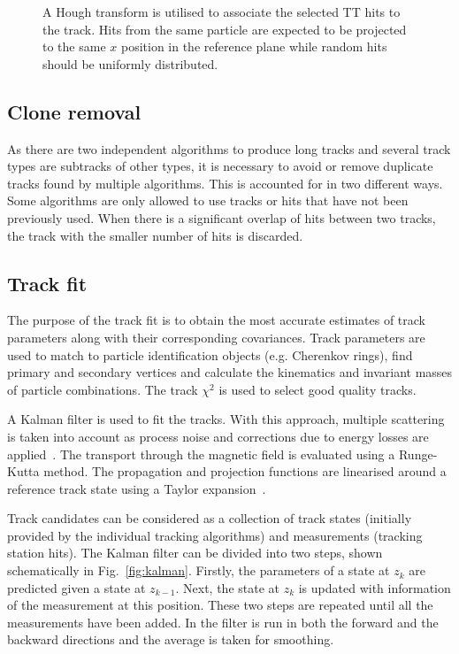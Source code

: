 \begin{figure}[!tb]
  \centering
  
  \caption{A Hough transform is utilised to associate the selected TT hits to the \velo track. Hits from the same particle are expected to be projected to the same $x$ position in the reference plane while random hits should be uniformly distributed.}
  \label{fig:velott-tracking}
\end{figure}

\subsection{Clone removal}
\label{sec:track:clone}

As there are two independent algorithms to produce long tracks and several track types are subtracks of other types, it is necessary to avoid or remove duplicate tracks found by multiple algorithms. This is accounted for in two different ways. Some algorithms are only allowed to use tracks or hits that have not been previously used. When there is a significant overlap of hits between two tracks, the track with the smaller number of hits is discarded. 

\subsection{Track fit}
\label{sec:track:fit}

The purpose of the track fit  is to obtain the most accurate estimates of track parameters along with their corresponding covariances. Track parameters are used to match to particle identification objects (e.g. Cherenkov rings), find primary and secondary vertices and calculate the kinematics and invariant masses of particle combinations. The track $\chi^{2}$ is used to select good quality tracks. 

A Kalman filter is used to fit the tracks. With this approach, multiple scattering is taken into account as process noise and corrections due to energy losses are applied~\cite{kalman}. The transport through the magnetic field is evaluated using a Runge-Kutta method. The propagation and projection functions are linearised around a reference track state using a Taylor expansion~\cite{jeroen}.

Track candidates can be considered as a collection of track states (initially provided by the individual tracking algorithms) and measurements (tracking station hits). The Kalman filter can be divided into two steps, shown schematically in Fig.~\ref{fig:kalman}. Firstly, the parameters of a state at $z_{k}$ are predicted given a state at $z_{k-1}$. Next, the state at $z_{k}$ is updated with information of the measurement at this position. These two steps are repeated until all the measurements have been added. In \lhcb the filter is run in both the forward and the backward directions and the average is taken for smoothing.

